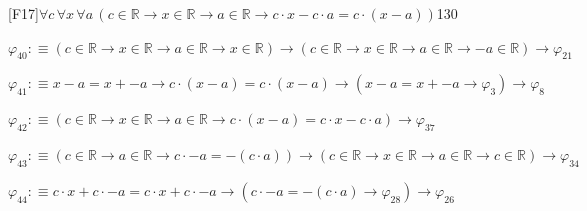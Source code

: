 \begin{fullproof}{[F17]}{$\forall c\,\forall x\,\forall a\,(c \in \mathbb{R} \to x \in \mathbb{R} \to a \in \mathbb{R} \to c \cdot x - c \cdot a = c \cdot (x - a))$}{130}
\begin{abbrevlist}
\item $\varphi_{40} :\equiv (c \in \mathbb{R} \to x \in \mathbb{R} \to a \in \mathbb{R} \to x \in \mathbb{R}) \to (c \in \mathbb{R} \to x \in \mathbb{R} \to a \in \mathbb{R} \to -a \in \mathbb{R}) \to \varphi_{21}$
\item $\varphi_{41} :\equiv x - a = x + -a \to c \cdot (x - a) = c \cdot (x - a) \to (x - a = x + -a \to \varphi_{3}) \to \varphi_{8}$
\item $\varphi_{42} :\equiv (c \in \mathbb{R} \to x \in \mathbb{R} \to a \in \mathbb{R} \to c \cdot (x - a) = c \cdot x - c \cdot a) \to \varphi_{37}$
\item $\varphi_{43} :\equiv (c \in \mathbb{R} \to a \in \mathbb{R} \to c \cdot -a = -(c \cdot a)) \to (c \in \mathbb{R} \to x \in \mathbb{R} \to a \in \mathbb{R} \to c \in \mathbb{R}) \to \varphi_{34}$
\item $\varphi_{44} :\equiv c \cdot x + c \cdot -a = c \cdot x + c \cdot -a \to (c \cdot -a = -(c \cdot a) \to \varphi_{28}) \to \varphi_{26}$
\end{abbrevlist}
\end{fullproof}
